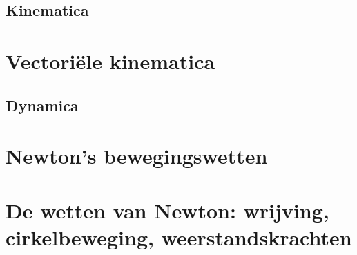 \documentclass{exam}
\begin{document}
\vspace*{\fill}
\begin{center}
    
\section*{Kinematica}
\end{center}

\vspace*{\fill}

\newpage

\section{Vectoriële kinematica}

\vspace{0.5cm}



\newpage

\vspace*{\fill}
\begin{center}
    
\section*{Dynamica}
\end{center}

\vspace*{\fill}

\newpage

\section{Newton's bewegingswetten}

\vspace{0.5cm}



\newpage

\section{De wetten van Newton: wrijving, cirkelbeweging, weerstandskrachten}

\vspace{0.5cm}


\end{document}

